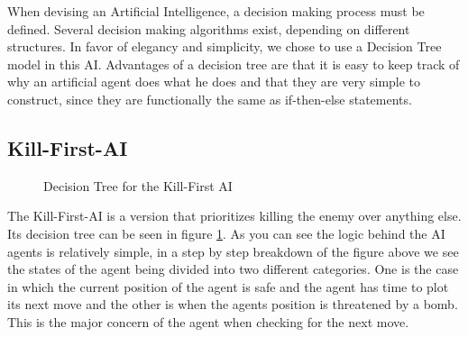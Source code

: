 When devising an Artificial Intelligence, a decision making process must be
defined. Several decision making algorithms exist, depending on different
structures. In favor of elegancy and simplicity, we chose to use a Decision Tree
model in this AI. Advantages of a decision tree are that it is easy to keep
track of why an artificial agent does what he does and that they are very simple
to construct, since they are functionally the same as if-then-else statements.

\subsection{Kill-First-AI}


\begin{figure}
\centering
\caption{Decision Tree for the Kill-First AI}
\label{fig:tree1}
\end{figure}

The Kill-First-AI is a version that prioritizes killing the enemy over anything
else. Its decision tree can be seen in figure \ref{fig:tree1}. As you can see
the logic behind the AI agents is relatively simple, in a step by step
breakdown of the figure above we see the states of the agent being divided
into two different categories. One is the case in which the current position
of the agent is safe and the agent has time to plot its next move and the
other is when the agents position is threatened by a bomb. This is the major
concern of the agent when checking for the next move. 

